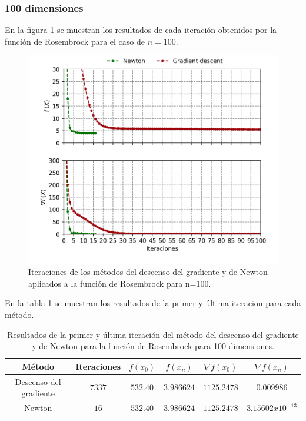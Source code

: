 \subsubsection{100 dimensiones}

En la figura \ref{fig:rosembrock_100} se muestran los resultados de cada iteración obtenidos por la función de Rosembrock para el caso de $n=100$.

\begin{figure}[H]
    \centering
    \includegraphics[width=12cm]{Graphics/Problema_2/rosembrock_100_predefined.png}
    \caption{Iteraciones de los métodos del descenso del gradiente y de Newton aplicados a la función de Rosembrock para n=100.}
    \label{fig:rosembrock_100}
\end{figure}

En la tabla \ref{table:rosembrock_100} se muestran los resultados de la primer y última iteracion para cada método.

\begin{table}[H]
    \centering
    \begin{tabular}{cccccc} \hline
        Método                 & Iteraciones & $f(x_0)$  & $f(x_n)$   & $\nabla f(x_0)$ & $\nabla f(x_n) $   \\ \hline
        Descenso del gradiente & $7337$      & $532.40 $ & $3.986624$ & $1125.2478$     & $0.009986$         \\
        Newton                 & $16$        & $532.40$  & $3.986624$ & $1125.2478$     & $3.15602x10^{-13}$ \\ \hline
    \end{tabular}
    \caption{Resultados de la primer y última iteración del método del descenso del gradiente y de Newton para la función de Rosembrock para 100 dimensiones.}
    \label{table:rosembrock_100}
\end{table}

